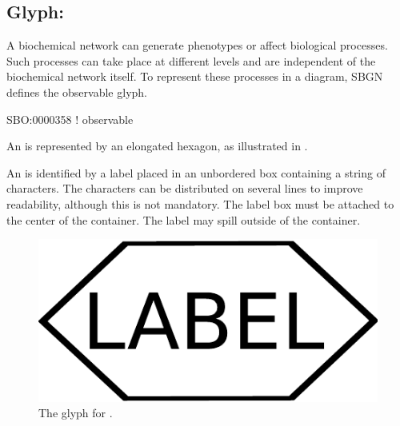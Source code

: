 \subsection{Glyph: }
\label{sec:af:observable}

A biochemical network can generate phenotypes or affect biological processes. Such processes can take place at different levels and are independent of the biochemical network itself. To represent these processes in a diagram, SBGN defines the observable glyph.

\begin{glyphDescription}

\glyphSboTerm SBO:0000358 ! observable

\glyphContainer An  is represented by an elongated
hexagon, as illustrated in .

\glyphLabel An  is identified by a label placed in an
unbordered box containing a string of characters.  The characters can be
distributed on several lines to improve readability, although this is not
mandatory.  The label box must be attached to the center of the
 container.  The label may spill outside of the container.

\end{glyphDescription}

\begin{figure}[H]
  \centering
  \includegraphics[scale = 0.3]{images/observable}
  \caption{The \AF glyph for .}
  \label{fig:af:observable}
\end{figure}
